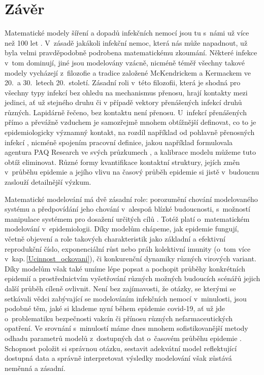 \section*{Závěr}

Matematické modely šíření a dopadů infekčních nemocí jsou tu s~námi už více než 100 let \cite{AndersonMay1991,KeelingRohani2008,VynnyckyWhite2010}. V~zásadě jakákoli infekční nemoc, která nás může napadnout, už byla velmi pravděpodobně podrobena matematickému zkoumání. Některé infekce v~tom dominují, jiné jsou modelovány vzácně, nicméně téměř všechny takové modely vycházejí z~filozofie a tradice založené McKendrickem a Kermackem ve 20.\ a 30.\ letech 20.~století. Zásadní roli v~této filozofii, která je shodná pro všechny typy infekcí bez ohledu na mechanismus přenosu, hrají kontakty mezi jedinci, ať už stejného druhu či v případě vektory přenášených infekcí druhů různých. Lapidárně řečeno, bez kontaktu není přenosu. U~infekcí přenášených přímo a převážně vzduchem je samozřejmě mnohem obtížnější definovat, co to je epidemiologicky významný kontakt, na rozdíl například od pohlavně přenosných infekcí \cite{Rao_etal2021}, nicméně spojením pracovní definice, jakou například formulovala agentura PAQ Research ve svých průzkumech \cite[\url{www.zivotbehempandemie.cz}]{paqcovid}, a kalibrace modelu můžeme tuto obtíž eliminovat. Různé formy kvantifikace kontaktní struktury, jejích změn v~průběhu epidemie a jejího vlivu na časový průběh epidemie si jistě v~budoucnu zaslouží detailnější výzkum.

Matematické modelování má dvě zásadní role: porozumění chování modelovaného systému a předpovídání jeho chování v~alespoň blízké budoucnosti, s~možností manipulace systémem pro dosažení určitých cílů \cite{GerleeLundh2016}. Totéž platí o~matematickém modelování v~epidemiologii. Díky modelům chápeme, jak epidemie fungují, včetně objevení a role takových charakteristik jako základní a efektivní reprodukční číslo, exponenciální růst nebo práh kolektivní imunity (o~tom více v~kap.\,\ref{Ucinnost_ockovani}), či konkurenční dynamiky různých virových variant. Díky modelům však také umíme lépe popsat a pochopit průběhy konkrétních epidemií a prostřednictvím vyšetřování různých možných budoucích scénářů jejich další průběh cíleně ovlivnit. Není bez zajímavosti, že otázky, se kterými se setkávali vědci zabývající se modelováním infekčních nemocí v~minulosti, jsou podobné těm, jaké si klademe nyní během epidemie covid-19, ať už jde o~problematiku bezpečnosti vakcín či přínosu různých nefarmaceutických opatření. Ve srovnání s~minulostí máme dnes mnohem sofistikovanější metody odhadu parametrů modelů z~dostupných dat o~časovém průběhu epidemie \cite{King_etal2016}. Schopnost položit si správnou otázku, sestavit adekvátní model reflektující dostupná data a správně interpretovat výsledky modelování však zůstává neměnná a zásadní.  

